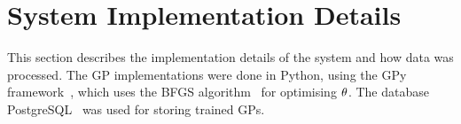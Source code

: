 
\section{System Implementation Details}
This section describes the implementation details of the system and
how data was processed. The GP implementations were done in Python, using the GPy
framework~\cite{gpy2014}, which uses the BFGS algorithm~\cite{fletcher2013practical} for
optimising $\theta$. The database
PostgreSQL~\cite{BibEntry2019Feb} was used for storing trained GPs.

